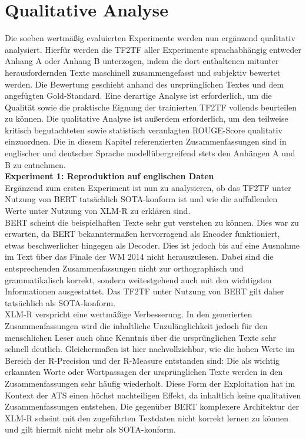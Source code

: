 \section{Qualitative Analyse}
\noindent
Die soeben wertmäßig evaluierten Experimente werden nun ergänzend qualitativ analysiert. Hierfür werden die \ac{TF2TF} aller Experimente sprachabhängig entweder Anhang A oder Anhang B unterzogen, indem die dort enthaltenen mitunter herausfordernden Texte maschinell zusammengefasst und subjektiv bewertet werden. Die Bewertung geschieht anhand des ursprünglichen Textes und dem angefügten Gold-Standard. Eine derartige Analyse ist erforderlich, um die Qualität sowie die praktische Eignung der trainierten \ac{TF2TF} vollends beurteilen zu können. Die qualitative Analyse ist außerdem erforderlich, um den teilweise kritisch begutachteten sowie statistisch veranlagten \ac{ROUGE}-Score qualitativ einzuordnen. Die in diesem Kapitel referenzierten Zusammenfassungen sind in englischer und deutscher Sprache modellübergreifend stets den Anhängen A und B zu entnehmen.\\

\noindent
\textbf{Experiment 1: Reproduktion auf englischen Daten}\\
\noindent
Ergänzend zum ersten Experiment ist nun zu analysieren, ob das \ac{TF2TF} unter Nutzung von \ac{BERT} tatsächlich \ac{SOTA}-konform ist und wie die auffallenden Werte unter Nutzung von \ac{XLM-R} zu erklären sind.\\

\noindent
\ac{BERT} scheint die beispielhaften Texte sehr gut verstehen zu können. Dies war zu erwarten, da \ac{BERT} bekanntermaßen hervorragend als Encoder funktioniert, etwas beschwerlicher hingegen als Decoder. Dies ist jedoch bis auf eine Ausnahme im Text über das Finale der WM 2014 nicht herauszulesen. Dabei sind die entsprechenden Zusammenfassungen nicht zur orthographisch und grammatikalisch korrekt, sondern weitestgehend auch mit den wichtigsten Informationen ausgestattet. Das \ac{TF2TF} unter Nutzung von \ac{BERT} gilt daher tatsächlich als \ac{SOTA}-konform.\\

\noindent
\ac{XLM-R} verspricht eine wertmäßige Verbesserung. In den generierten Zusammenfassungen wird die inhaltliche Unzulänglichkeit jedoch für den menschlichen Leser auch ohne Kenntnis über die ursprünglichen Texte sehr schnell deutlich. Gleichermaßen ist hier nachvollziehbar, wie die hohen Werte im Bereich der R-Precision und der R-Measure entstanden sind: Die als wichtig erkannten Worte oder Wortpassagen der ursprünglichen Texte werden in den Zusammenfassungen sehr häufig wiederholt. Diese Form der Exploitation hat im Kontext der \ac{ATS} einen höchst nachteiligen Effekt, da inhaltlich keine qualitativen Zusammenfassungen entstehen. Die gegenüber \ac{BERT} komplexere Architektur der \ac{XLM-R} scheint mit den zugeführten Textdaten nicht korrekt lernen zu können und gilt hiermit nicht mehr als \ac{SOTA}-konform.
\newpage

